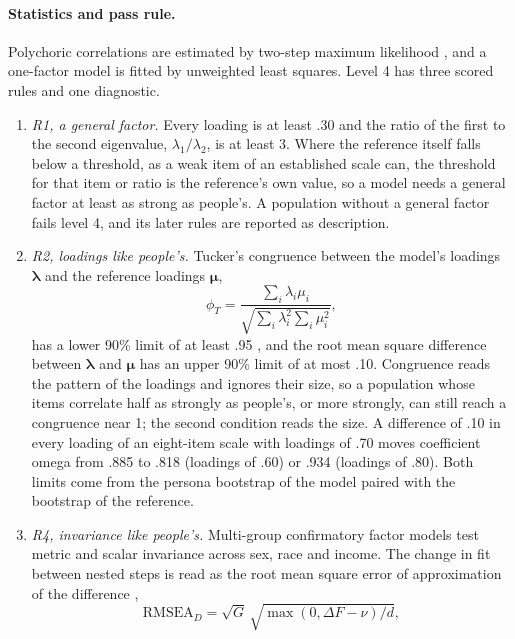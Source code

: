 \paragraph{Statistics and pass rule.}
Polychoric correlations are estimated by two-step maximum likelihood \citep{olsson1979polychoric}, and a one-factor model is fitted by unweighted least squares.
Level 4 has three scored rules and one diagnostic.
\begin{enumerate}
\item \emph{R1, a general factor.} Every loading is at least .30 and the ratio of the first to the second eigenvalue, $\lambda_1/\lambda_2$, is at least 3. Where the reference itself falls below a threshold, as a weak item of an established scale can, the threshold for that item or ratio is the reference's own value, so a model needs a general factor at least as strong as people's. A population without a general factor fails level 4, and its later rules are reported as description.
\item \emph{R2, loadings like people's.} Tucker's congruence between the model's loadings $\boldsymbol{\lambda}$ and the reference loadings $\boldsymbol{\mu}$,
\begin{equation}
\phi_T = \frac{\sum_i \lambda_i \mu_i}{\sqrt{\sum_i \lambda_i^2 \sum_i \mu_i^2}},
\end{equation}
has a lower 90\% limit of at least .95 \citep{lorenzoseva2006congruence}, and the root mean square difference between $\boldsymbol{\lambda}$ and $\boldsymbol{\mu}$ has an upper 90\% limit of at most .10.
Congruence reads the pattern of the loadings and ignores their size, so a population whose items correlate half as strongly as people's, or more strongly, can still reach a congruence near 1; the second condition reads the size.
A difference of .10 in every loading of an eight-item scale with loadings of .70 moves coefficient omega from .885 to .818 (loadings of .60) or .934 (loadings of .80).
Both limits come from the persona bootstrap of the model paired with the bootstrap of the reference.
\item \emph{R4, invariance like people's.} Multi-group confirmatory factor models test metric and scalar invariance across sex, race and income. The change in fit between nested steps is read as the root mean square error of approximation of the difference \citep{savalei2024rmsea},
\begin{equation}
\mathrm{RMSEA}_D = \sqrt{G}\,\sqrt{\max(0, \Delta F - \nu)/d},
\end{equation}

\end{enumerate}
